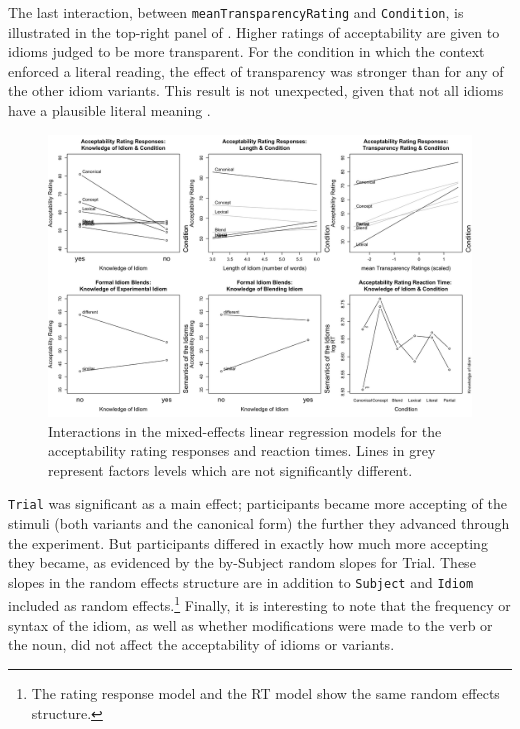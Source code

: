 \documentclass[output=paper
,modfonts
,nonflat]{langsci/langscibook}
\begin{document}

The last interaction, between \texttt{meanTransparencyRating} and \texttt{Condition}, is illustrated in the top-right panel of . Higher ratings of acceptability are given to idioms judged to be more transparent. For the condition in which the context enforced a literal reading, the effect of transparency was stronger than for any of the other idiom variants. This result is not unexpected, given that not all idioms have a plausible literal meaning \citep{TitoneConnine1994}. 


\begin{figure}
\centering
\includegraphics[width=\textwidth]{figures/ratings.png}
\caption{Interactions in the mixed-effects linear regression models for the acceptability rating responses and reaction times. Lines in grey represent factors levels which are not significantly different.}
\label{plotRatings}
\end{figure}

\texttt{Trial} was significant as a main effect; participants became more accepting of the stimuli (both variants and the canonical form) the further they advanced through the experiment. But participants differed in exactly how much more accepting they became, as evidenced by the by-Subject random slopes for Trial. 
These slopes in the random effects structure are in addition to \texttt{Subject} and \texttt{Idiom} included as random effects.\footnote{The rating response model and the RT model show the same random effects structure.} Finally, it is interesting to note that the frequency or syntax of the idiom, as well as whether modifications were made to the verb or the noun, did not affect the acceptability of idioms or variants. 
\end{document}
